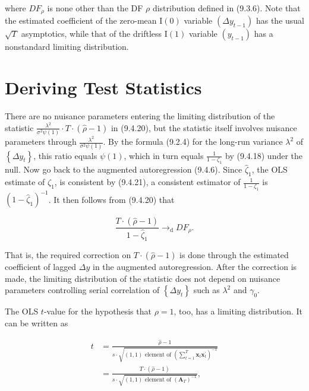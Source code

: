 \documentclass[10pt]{article}
\begin{document}
where $D F_{\rho}$ is none other than the DF $\rho$ distribution defined in (9.3.6). Note that the estimated coefficient of the zero-mean $\mathrm{I}(0)$ variable $\left(\Delta y_{t-1}\right)$ has the usual $\sqrt{T}$ asymptotics, while that of the driftless $\mathrm{I}(1)$ variable $\left(y_{t-1}\right)$ has a nonstandard limiting distribution.

\section*{Deriving Test Statistics}
There are no nuisance parameters entering the limiting distribution of the statistic $\frac{\lambda^{2}}{\sigma^{2} \psi(1)} \cdot T \cdot(\hat{\rho}-1)$ in (9.4.20), but the statistic itself involves nuisance parameters through $\frac{\lambda^{2}}{\sigma^{2} \psi(1)}$. By the formula (9.2.4) for the long-run variance $\lambda^{2}$ of $\left\{\Delta y_{t}\right\}$, this ratio equals $\psi(1)$, which in turn equals $\frac{1}{1-\zeta_{1}}$ by (9.4.18) under the null. Now go back to the augmented autoregression (9.4.6). Since $\hat{\zeta}_{1}$, the OLS estimate of $\zeta_{1}$, is consistent by (9.4.21), a consistent estimator of $\frac{1}{1-\zeta_{1}}$ is $\left(1-\hat{\zeta}_{1}\right)^{-1}$. It then follows from (9.4.20) that


\begin{equation*}
\frac{T \cdot(\hat{\rho}-1)}{1-\hat{\zeta}_{1}} \rightarrow_{\mathrm{d}} D F_{\rho} . \tag{9.4.22}
\end{equation*}


That is, the required correction on $T \cdot(\hat{\rho}-1)$ is done through the estimated coefficient of lagged $\Delta y$ in the augmented autoregression. After the correction is made, the limiting distribution of the statistic does not depend on nuisance parameters controlling serial correlation of $\left\{\Delta y_{t}\right\}$ such as $\lambda^{2}$ and $\gamma_{0}$.

The OLS $t$-value for the hypothesis that $\rho=1$, too, has a limiting distribution. It can be written as


\begin{align*}
t & =\frac{\hat{\rho}-1}{s \cdot \sqrt{(1,1) \text { element of }\left(\sum_{t=1}^{T} \mathbf{x}_{t} \mathbf{x}_{t}^{\prime}\right)^{-1}}} \\
& =\frac{T \cdot(\hat{\rho}-1)}{s \cdot \sqrt{(1,1) \text { element of }\left(\mathbf{A}_{T}\right)^{-1}}}, \tag{9.4.23}
\end{align*}
\end{document}
